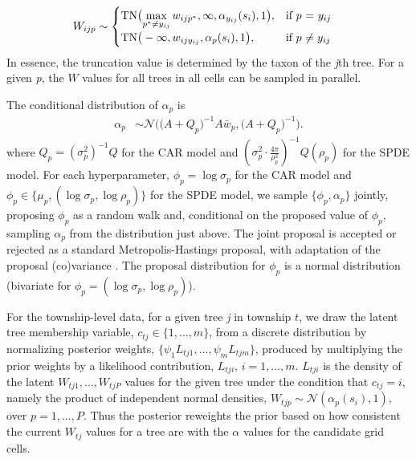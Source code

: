 \documentclass[10pt,letterpaper]{article}
\newcommand{\N}{\mathcal{N}}
\begin{document}
\begin{align}
W_{ijp} & \sim\begin{cases}
\mbox{TN}\big({\displaystyle \max_{p^{*}\neq y_{ij}}w_{ijp^{*}},\infty,\alpha_{y_{ij}}(s_{i}),1\big),} & \mbox{if }p\mbox{ = \ensuremath{y_{ij}}}\\
\mbox{TN}\big(-\infty,w_{ijy_{ij}},\alpha_{p}(s_{i}),1\big), & \mbox{if }p\mbox{ \ensuremath{\neq y_{ij}}}
\end{cases}
\end{align}
In essence, the truncation value is determined by the taxon of the
\emph{j}th tree. For a given \emph{p}, the $W$ values for all trees in all
cells can be sampled in parallel. 

The conditional distribution of $\alpha_{p}$ is 
\begin{align}
\alpha_{p} & \sim\N\bigg(\Big(A+Q_{p}\Big)^{-1}A\bar{w}_{p},\Big(A+Q_{p}\Big)^{-1}\bigg).
\end{align}
where $Q_{p}=(\sigma_{p}^{2})^{-1}Q$ for the CAR model and $\left(\sigma_{p}^{2}\cdot\frac{4\pi}{\rho_{p}^{2}}\right)^{-1}Q(\rho_{p})$
for the SPDE model. For each hyperparameter, $\phi_{p}=\log\sigma_{p}$
for the CAR model and $\phi_{p}\in\{\mu_{p},(\log\sigma_{p},\log\rho_{p})\}$
for the SPDE model, we sample $\{\phi_{p},\alpha_{p}\}$ jointly,
proposing $\phi_{p}$ as a random walk and, conditional on the proposed
value of $\phi_{p}$, sampling $\alpha_{p}$ from the distribution
just above. The joint proposal is accepted or rejected as a standard
Metropolis-Hastings proposal, with adaptation of the proposal (co)variance
\cite{Shab:Well:2011}. The proposal distribution for $\phi_{p}$
is a normal distribution (bivariate for $\phi_{p}=(\log\sigma_{p},\log\rho_{p})$).

\noindent 

For the township-level data, for a given tree \emph{j} in township $t$,
we draw the latent tree membership variable, $c_{tj}\in\{1,\ldots,m\}$,
from a discrete distribution by normalizing posterior weights, $\{\psi_{1}L_{tj1},\ldots,\psi_{m}L_{tjm}\}$,
produced by multiplying the prior weights by a likelihood contribution,
$L_{tji}$, $i=1,\ldots,m$. $L_{tji}$ is the density of the latent
$W_{tj1},\ldots,W_{tjP}$ values for the given tree under the condition
that $c_{tj}=i$, namely the product of independent normal densities,
$W_{tjp}\sim\N(\alpha_{p}(s_{i}),1)$, over $p=1,\ldots,P$.
Thus the posterior reweights the prior based on how consistent the
current $W_{tj}$ values for a tree are with the $\alpha$ values
for the candidate grid cells. 
\end{document}
